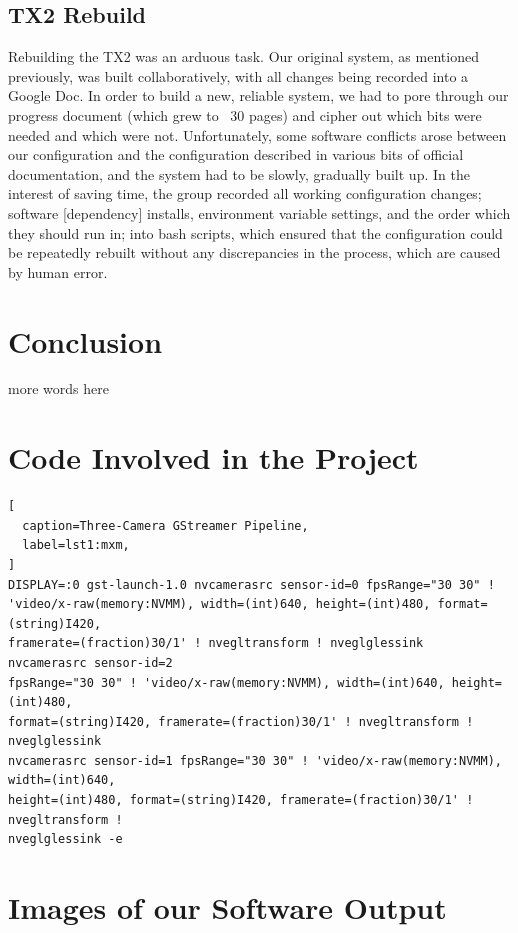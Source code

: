 \documentclass[letterpaper,10pt,serif,draftclsnofoot,onecolumn,compsoc,titlepage]{IEEEtran}
\begin{document}
\subsection{TX2 Rebuild}
Rebuilding the TX2 was an arduous task. Our original system, as mentioned previously, was built 
collaboratively, with all changes being recorded into a Google Doc. In order to build a new, 
reliable system, we had to pore through our progress document (which grew to ~30 pages) and cipher 
out which bits were needed and which were not. Unfortunately, some software conflicts arose 
between our configuration and the configuration described in various bits of official documentation, 
and the system had to be slowly, gradually built up. In the interest of saving time, the group 
recorded all working configuration changes; software [dependency] installs, environment variable 
settings, and the order which they should run in; into bash scripts, which ensured that the 
configuration could be repeatedly rebuilt without any discrepancies in the process, which are 
caused by human error.

\section{Conclusion}

more words here\\

\section{Code Involved in the Project}

\begin{lstlisting}[
  caption=Three-Camera GStreamer Pipeline,
  label=lst1:mxm,
]
DISPLAY=:0 gst-launch-1.0 nvcamerasrc sensor-id=0 fpsRange="30 30" ! 
'video/x-raw(memory:NVMM), width=(int)640, height=(int)480, format=(string)I420, 
framerate=(fraction)30/1' ! nvegltransform ! nveglglessink  nvcamerasrc sensor-id=2 
fpsRange="30 30" ! 'video/x-raw(memory:NVMM), width=(int)640, height=(int)480, 
format=(string)I420, framerate=(fraction)30/1' ! nvegltransform ! nveglglessink 
nvcamerasrc sensor-id=1 fpsRange="30 30" ! 'video/x-raw(memory:NVMM), width=(int)640, 
height=(int)480, format=(string)I420, framerate=(fraction)30/1' ! nvegltransform ! 
nveglglessink -e
\end{lstlisting}

\section{Images of our Software Output}
\end{document}
